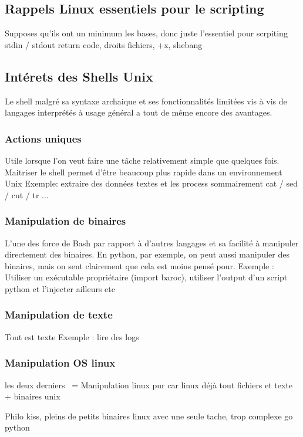 \documentclass[11pt,a4paper]{article}
\begin{document}
\subsection{Rappels Linux essentiels pour le scripting}
Supposes qu'ils ont un minimum les bases, donc juste l'essentiel pour scrpiting
stdin / stdout
return code, 
droits fichiers, +x, shebang

\subsection{Intérets des Shells Unix}
Le shell malgré sa syntaxe archaique et ses fonctionnalités limitées vis à vis de langages interprétés à usage général a tout de même encore des avantages.

\subsubsection{Actions uniques}
Utile lorsque l'on veut faire une tâche relativement simple que quelques fois. 
Maitriser le shell permet d'être beaucoup plus rapide dans un environnement Unix
Exemple: extraire des données textes et les process sommairement
cat / sed / cut / tr ...

\subsubsection{Manipulation de binaires}
L'une des force de Bash par rapport à d'autres langages et sa facilité à manipuler directement des binaires. En python, par exemple, on peut aussi manipuler des binaires, mais on sent clairement que cela est moins pensé pour.
Exemple : Utiliser un exécutable propriétaire (import baroc), utiliser l'output d'un script python et l'injecter ailleurs etc


\subsubsection{Manipulation de texte}
Tout est texte
Exemple : lire des logs

\subsubsection{Manipulation OS linux}
les deux derniers ~= Manipulation linux pur car linux déjà tout fichiers et texte + binaires unix


Philo kiss, pleins de petits binaires linux avec une seule tache, trop complexe go python
\end{document}
